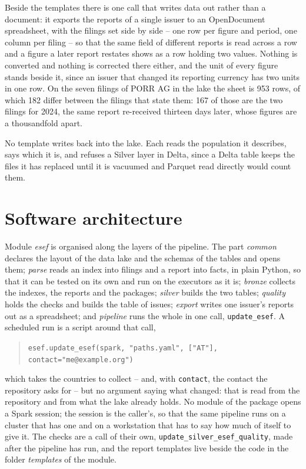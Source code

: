 Beside the templates there is one call that writes data out rather than a document: it exports the reports of a single issuer to an OpenDocument spreadsheet, with the filings set side by side -- one row per figure and period, one column per filing -- so that the same field of different reports is read across a row and a figure a later report restates shows as a row holding two values. Nothing is converted and nothing is corrected there either, and the unit of every figure stands beside it, since an issuer that changed its reporting currency has two units in one row. On the seven filings of PORR AG in the lake the sheet is 953 rows, of which 182 differ between the filings that state them: 167 of those are the two filings for 2024, the same report re-received thirteen days later, whose figures are a thousandfold apart.

No template writes back into the lake. Each reads the population it describes, says which it is, and refuses a Silver layer in Delta, since a Delta table keeps the files it has replaced until it is vacuumed and Parquet read directly would count them.

\section{Software architecture}

Module \emph{esef} is organised along the layers of the pipeline. The part \emph{common} declares the layout of the data lake and the schemas of the tables and opens them; \emph{parse} reads an index into filings and a report into facts, in plain Python, so that it can be tested on its own and run on the executors as it is; \emph{bronze} collects the indexes, the reports and the packages; \emph{silver} builds the two tables; \emph{quality} holds the checks and builds the table of issues; \emph{export} writes one issuer's reports out as a spreadsheet; and \emph{pipeline} runs the whole in one call, \verb|update_esef|. A scheduled run is a script around that call,
\begin{quote}
\verb|esef.update_esef(spark, "paths.yaml", ["AT"], contact="me@example.org")|
\end{quote}
which takes the countries to collect -- and, with \verb|contact|, the contact the repository asks for -- but no argument saying what changed: that is read from the repository and from what the lake already holds. No module of the package opens a Spark session; the session is the caller's, so that the same pipeline runs on a cluster that has one and on a workstation that has to say how much of itself to give it. The checks are a call of their own, \verb|update_silver_esef_quality|, made after the pipeline has run, and the report templates live beside the code in the folder \emph{templates} of the module.
